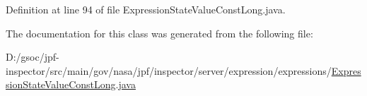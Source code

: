 Definition at line 94 of file Expression\+State\+Value\+Const\+Long.\+java.



The documentation for this class was generated from the following file\+:\begin{DoxyCompactItemize}
\item 
D\+:/gsoc/jpf-\/inspector/src/main/gov/nasa/jpf/inspector/server/expression/expressions/\hyperlink{_expression_state_value_const_long_8java}{Expression\+State\+Value\+Const\+Long.\+java}\end{DoxyCompactItemize}

